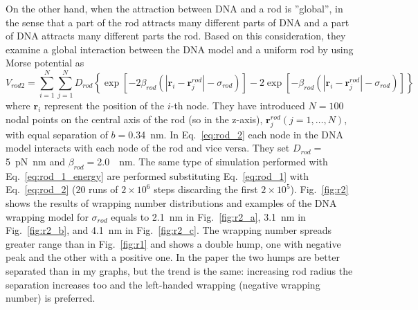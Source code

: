 \documentclass[a4paper,10pt]{article}
\begin{document}
On the other hand, when the attraction between DNA and a rod is ''global'', in the sense that a part of the rod attracts many different parts of DNA and a part of DNA attracts many different parts the rod.
Based on this consideration, they examine a global interaction between the DNA model and a uniform rod by using Morse potential as
\begin{equation}\label{eq:rod_2}
V_{rod2}=\sum^{N}_{i=1}\sum^{N}_{j=1}D_{rod}\left \{\exp\left [-2\beta_{rod}\left (\left |\textbf{r}_{i}-\textbf{r}_{j}^{rod}\right |-\sigma_{rod}\right )\right ]-2\exp\left [-\beta_{rod}\left (\left |\textbf{r}_{i}-\textbf{r}_{j}^{rod}\right |-\sigma_{rod}\right )\right ]\right \}
\end{equation}
where $\textbf{r}_{i}$ represent the position of the $i$-th node.
They have introduced $N=100$ nodal points on the central axis of the rod (so in the z-axis), $\textbf{r}_{j}^{rod} \left (j=1,\dots,N\right )$, with equal separation of $b=$\SI{.34}{\nm}.
In Eq.~\ref{eq:rod_2} each node in the DNA model interacts with each node of the rod and vice versa.
They set $D_{rod}=$\SI{5}{\pico\newton\nano\meter} and $\beta_{rod}=$\SI{2.0}{\per\nm}.
The same type of simulation performed with Eq.~\ref{eq:rod_1_energy} are performed substituting Eq.~\ref{eq:rod_1} with Eq.~\ref{eq:rod_2} ($20$ runs of $2\times 10^6$ steps discarding the first $2\times 10^5$).
Fig.~\ref{fig:r2} shows the results of wrapping number distributions and examples of the DNA wrapping model for $\sigma_{rod}$ equals to \SI{2.1}{\nm} in Fig.~\ref{fig:r2_a}, \SI{3.1}{\nm} in Fig.~\ref{fig:r2_b}, and \SI{4.1}{\nm} in Fig.~\ref{fig:r2_c}.
The wrapping number spreads greater range than in Fig.~\ref{fig:r1} and shows a double hump, one with negative peak and the other with a positive one.
In the paper the two humps are better separated than in my graphs, but the trend is the same: increasing rod radius the separation increases too and the left-handed wrapping (negative wrapping number) is preferred.
\end{document}
